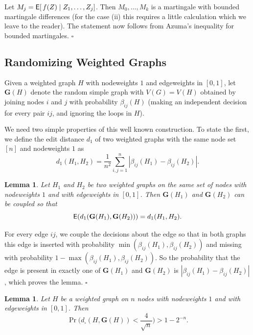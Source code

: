 \documentclass[12pt]{article}
\newtheorem{lemma}[theorem]{Lemma}
\numberwithin{equation}{section}
\newenvironment{proof}{\medskip\noindent{\bf Proof.
}}{\hfill$\square$\medskip}
\def\E{{\sf E}}
\def\bG{{\mathbf G}}
\begin{document}
\begin{proof}
Let $M_j=\E[\,f(Z)\mid Z_1,\dots,Z_j]$.  Then $M_0,\dots,M_k$ is a
martingale with bounded martingale differences (for the case (ii)
this requires a little calculation which we leave to the reader). The
statement now follows from Azuma's inequality for bounded
martingales.
\end{proof}


\subsection{Randomizing Weighted Graphs}
\label{sec:RandWeightG}


Given a weighted graph $H$ with nodeweights $1$ and edgeweights in
$[0,1]$, let $\bG(H)$ denote the random simple graph with $V(G)=V(H)$
obtained by joining nodes $i$ and $j$ with probability
$\beta_{ij}(H)$ (making an independent decision for every pair $ij$,
and ignoring the loops in $H$).

We need two simple properties of this well known construction. To
state the first, we define the edit distance $d_1$ of two weighted
graphs with the same node set $[n]$ and nodeweights $1$ as
\[
d_1(H_1,H_2)=\frac 1{n^2}\sum_{i,j=1}^n|\beta_{ij}(H_1)-\beta_{ij}(H_2)|.
\]

\begin{lemma}\label{lem:GH-COUPL}
Let $H_1$ and $H_2$ be two weighted graphs on the same set of nodes
with nodeweights $1$ and with edgeweights in $[0,1]$. Then
$\bG(H_1)$ and $\bG(H_2)$ can be coupled so that
\[
\E(d_1(\bG(H_1),\bG(H_2))) = d_1(H_1,H_2).
\]
\end{lemma}

\begin{proof}
For every edge $ij$, we couple the decisions about the edge so that
in both graphs this edge is inserted with probability
$\min(\beta_{ij}(H_1),\beta_{ij}(H_2))$ and missing with probability
$1-\max(\beta_{ij}(H_1),\beta_{ij}(H_2))$. So the probability that
the edge is present in exactly one of $\bG(H_1)$ and $\bG(H_2)$ is
$|\beta_{ij}(H_1)-\beta_{ij}(H_2)|$, which proves the lemma.
\end{proof}

\begin{lemma}\label{lem:GH-CLOSE}
Let $H$ be a weighted graph on $n$ nodes
with nodeweights $1$ and with edgeweights in $[0,1]$. Then
\[
\Pr\biggl(d_\square(H,\bG(H)) < \frac {4}{\sqrt n}
\biggr)
>1-2^{-n}.
\]
\end{lemma}
\end{document}
